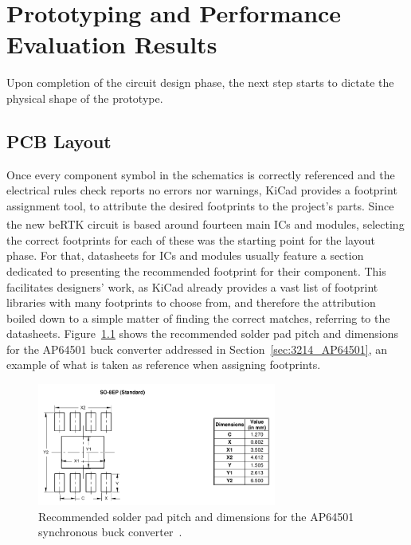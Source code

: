 

\chapter{Prototyping and Performance Evaluation Results}\label{cha:chapter5_PrototypingPerf}

Upon completion of the circuit design phase, the next step starts to dictate the physical shape of the prototype.

\section{PCB Layout}\label{sec:5_PCBlayout} %

Once every component symbol in the schematics is correctly referenced and the electrical rules check reports no errors nor warnings, KiCad provides a footprint assignment tool, to attribute the desired footprints to the project's parts. Since the new beRTK\textsuperscript{\textregistered} circuit is based around fourteen main ICs and modules, selecting the correct footprints for each of these was the starting point for the layout phase. For that, datasheets for ICs and modules usually feature a section dedicated to presenting the recommended footprint for their component. This facilitates designers' work, as KiCad already provides a vast list of footprint libraries with many footprints to choose from, and therefore the attribution boiled down to a simple matter of finding the correct matches, referring to the datasheets. Figure~\ref{fig:footprint_AP64501} shows the recommended solder pad pitch and dimensions for the AP64501 buck converter addressed in Section~\ref{sec:3214_AP64501}, an example of what is taken as reference when assigning footprints.

\begin{figure}[h]
	\centering
	\includegraphics[width=0.7\textwidth]{Chapters/Figures/chapter5/footprint_AP64501.pdf}
	\caption{Recommended solder pad pitch and dimensions for the AP64501 synchronous buck converter~\cite{AP64501}.}
	\label{fig:footprint_AP64501}
\end{figure}

